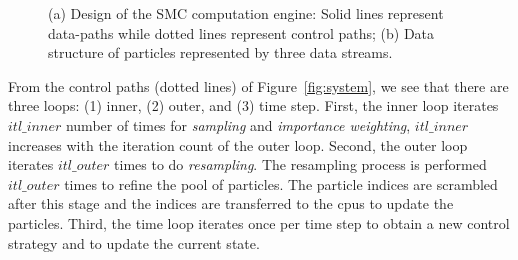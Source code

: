 \setcounter{subfigure}{0}
\begin{figure}[t!]
\centering
{}
\caption{(a) Design of the SMC computation engine: Solid lines represent data-paths while dotted lines represent control paths; (b) Data structure of particles represented by three data streams.}
\end{figure}

From the control paths (dotted lines) of Figure~\ref{fig:system}, we see that there are three loops: 
(1) inner, (2) outer, and (3) time step.
First, the inner loop iterates $itl\_inner$ number of times for \textit{sampling} and \textit{importance weighting},
$itl\_inner$ increases with the iteration count of the outer loop.
Second, the outer loop iterates $itl\_outer$ times to do \textit{resampling}.
The resampling process is performed $itl\_outer$ times to refine the pool of particles.
The particle indices are scrambled after this stage and the indices are transferred to the \glspl{cpu} to update the particles.
Third, the time loop iterates once per time step to obtain a new control strategy and to update the current state.


